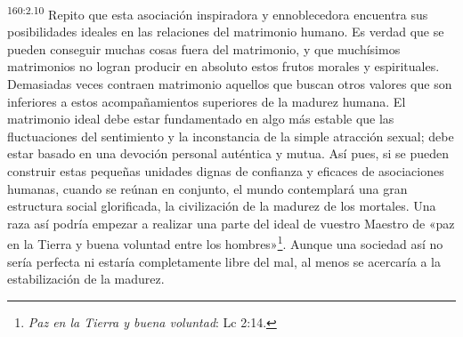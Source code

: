 \par
\textsuperscript{160:2.10} Repito que esta asociación inspiradora y ennoblecedora encuentra sus posibilidades ideales en las relaciones del matrimonio humano. Es verdad que se pueden conseguir muchas cosas fuera del matrimonio, y que muchísimos matrimonios no logran producir en absoluto estos frutos morales y espirituales. Demasiadas veces contraen matrimonio aquellos que buscan otros valores que son inferiores a estos acompañamientos superiores de la madurez humana. El matrimonio ideal debe estar fundamentado en algo más estable que las fluctuaciones del sentimiento y la inconstancia de la simple atracción sexual; debe estar basado en una devoción personal auténtica y mutua. Así pues, si se pueden construir estas pequeñas unidades dignas de confianza y eficaces de asociaciones humanas, cuando se reúnan en conjunto, el mundo contemplará una gran estructura social glorificada, la civilización de la madurez de los mortales. Una raza así podría empezar a realizar una parte del ideal de vuestro Maestro de «paz en la Tierra y buena voluntad entre los hombres»\footnote{\textit{Paz en la Tierra y buena voluntad}: Lc 2:14.}. Aunque una sociedad así no sería perfecta ni estaría completamente libre del mal, al menos se acercaría a la estabilización de la madurez.

